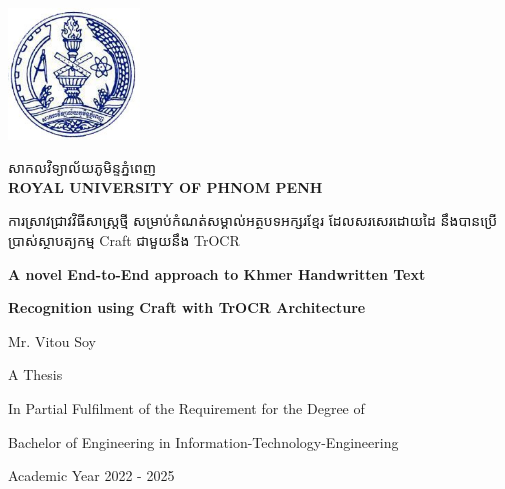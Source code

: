 \begin{titlepage}
    \centering
    \vspace*{1cm}

    \begin{minipage}{0.25\textwidth}
        \includegraphics[width=3.5cm]{figures/RUPP.jpg}
    \end{minipage}
    \hfill
    \begin{minipage}{0.7\textwidth}
        \raggedright
        {\khmerfont\fontsize{16pt}{20pt}\selectfont សាកលវិទ្យាល័យភូមិន្ទភ្នំពេញ\\[0.6em]}
        {\large\bfseries ROYAL UNIVERSITY OF PHNOM PENH}
    \end{minipage}

    \vspace{2cm}

    {\khmerfont\fontsize{12pt}{20pt}\selectfont ការស្រាវជ្រាវវិធីសាស្ដ្រថ្មី  សម្រាប់កំណត់សម្គាល់អត្ថបទអក្សរខ្មែរ ដែលសរសេរដោយដៃ នឹងបានប្រើប្រាស់ស្ថាបត្យកម្ម Craft ជាមួយនឹង TrOCR\\[0.4em]}
    {\englishfont\fontsize{15pt}{20pt}\selectfont\bfseries A novel End-to-End approach to Khmer Handwritten Text \par}
    {\englishfont\fontsize{15pt}{20pt}\selectfont\bfseries Recognition using Craft with TrOCR Architecture \par}

    \vspace{3.0cm}

    {\englishfont\fontsize{16pt}{20pt}\selectfont Mr. Vitou Soy\par}

    \vspace{3.0cm}

    {\englishfont\fontsize{16pt}{20pt}\selectfont A Thesis\par}
    \vspace{0.5cm}
    {\large In Partial Fulfilment of the Requirement for the Degree of\par}
    {\large Bachelor of Engineering in Information-Technology-Engineering\par}
    {\large Academic Year 2022 - 2025\par}


\end{titlepage}
